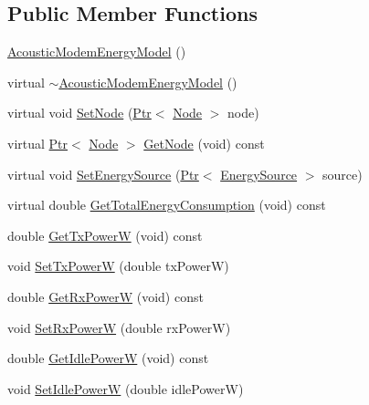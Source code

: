 \subsection*{Public Member Functions}
\begin{DoxyCompactItemize}
\item 
\hyperlink{classns3_1_1AcousticModemEnergyModel_a9332ef84f0e5ea3266ccef6f43deedb4}{Acoustic\+Modem\+Energy\+Model} ()
\item 
virtual \hyperlink{classns3_1_1AcousticModemEnergyModel_a747f3191bb071d52db10a5389339edb4}{$\sim$\+Acoustic\+Modem\+Energy\+Model} ()
\item 
virtual void \hyperlink{classns3_1_1AcousticModemEnergyModel_a695fcf68618fa8e035bf7d3cf017fd90}{Set\+Node} (\hyperlink{classns3_1_1Ptr}{Ptr}$<$ \hyperlink{classns3_1_1Node}{Node} $>$ node)
\item 
virtual \hyperlink{classns3_1_1Ptr}{Ptr}$<$ \hyperlink{classns3_1_1Node}{Node} $>$ \hyperlink{classns3_1_1AcousticModemEnergyModel_a0a97672a3fe563d7d1830a41aa338170}{Get\+Node} (void) const 
\item 
virtual void \hyperlink{classns3_1_1AcousticModemEnergyModel_ae8528d992ff06b11da750d064e0c9ce3}{Set\+Energy\+Source} (\hyperlink{classns3_1_1Ptr}{Ptr}$<$ \hyperlink{classns3_1_1EnergySource}{Energy\+Source} $>$ source)
\item 
virtual double \hyperlink{classns3_1_1AcousticModemEnergyModel_a4eb0763bc03c52338f83f011e4c430fd}{Get\+Total\+Energy\+Consumption} (void) const 
\item 
double \hyperlink{classns3_1_1AcousticModemEnergyModel_a47f9c6f65e5ffd7133e6fc70cf173bd8}{Get\+Tx\+PowerW} (void) const 
\item 
void \hyperlink{classns3_1_1AcousticModemEnergyModel_adf451e8028d29a8a98012ab11da45359}{Set\+Tx\+PowerW} (double tx\+PowerW)
\item 
double \hyperlink{classns3_1_1AcousticModemEnergyModel_a41af38f83b970d959b120525507c020b}{Get\+Rx\+PowerW} (void) const 
\item 
void \hyperlink{classns3_1_1AcousticModemEnergyModel_a2c0eae8ca46f703c3559c8b54617b34f}{Set\+Rx\+PowerW} (double rx\+PowerW)
\item 
double \hyperlink{classns3_1_1AcousticModemEnergyModel_a60265ec94e8c5422f7042f10bad02b2b}{Get\+Idle\+PowerW} (void) const 
\item 
void \hyperlink{classns3_1_1AcousticModemEnergyModel_aa7d720f7e9784c31a8bb016b7d2f3677}{Set\+Idle\+PowerW} (double idle\+PowerW)
\item 

\end{DoxyCompactItemize}
